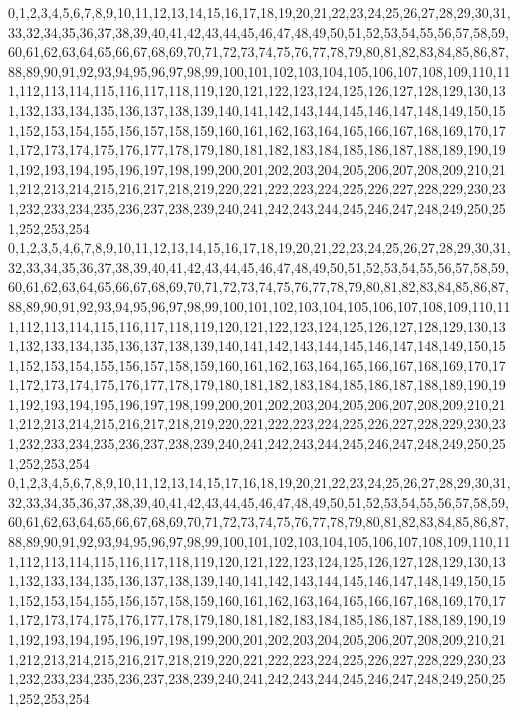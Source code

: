 \documentclass[12pt]{article}
\begin{document}
{0,1,2,3,4,5,6,7,8,9,10,11,12,13,14,15,16,17,18,19,20,21,22,23,24,25,26,27,28,29,30,31,33,32,34,35,36,37,38,39,40,41,42,43,44,45,46,47,48,49,50,51,52,53,54,55,56,57,58,59,60,61,62,63,64,65,66,67,68,69,70,71,72,73,74,75,76,77,78,79,80,81,82,83,84,85,86,87,88,89,90,91,92,93,94,95,96,97,98,99,100,101,102,103,104,105,106,107,108,109,110,111,112,113,114,115,116,117,118,119,120,121,122,123,124,125,126,127,128,129,130,131,132,133,134,135,136,137,138,139,140,141,142,143,144,145,146,147,148,149,150,151,152,153,154,155,156,157,158,159,160,161,162,163,164,165,166,167,168,169,170,171,172,173,174,175,176,177,178,179,180,181,182,183,184,185,186,187,188,189,190,191,192,193,194,195,196,197,198,199,200,201,202,203,204,205,206,207,208,209,210,211,212,213,214,215,216,217,218,219,220,221,222,223,224,225,226,227,228,229,230,231,232,233,234,235,236,237,238,239,240,241,242,243,244,245,246,247,248,249,250,251,252,253,254\\
0,1,2,3,5,4,6,7,8,9,10,11,12,13,14,15,16,17,18,19,20,21,22,23,24,25,26,27,28,29,30,31,32,33,34,35,36,37,38,39,40,41,42,43,44,45,46,47,48,49,50,51,52,53,54,55,56,57,58,59,60,61,62,63,64,65,66,67,68,69,70,71,72,73,74,75,76,77,78,79,80,81,82,83,84,85,86,87,88,89,90,91,92,93,94,95,96,97,98,99,100,101,102,103,104,105,106,107,108,109,110,111,112,113,114,115,116,117,118,119,120,121,122,123,124,125,126,127,128,129,130,131,132,133,134,135,136,137,138,139,140,141,142,143,144,145,146,147,148,149,150,151,152,153,154,155,156,157,158,159,160,161,162,163,164,165,166,167,168,169,170,171,172,173,174,175,176,177,178,179,180,181,182,183,184,185,186,187,188,189,190,191,192,193,194,195,196,197,198,199,200,201,202,203,204,205,206,207,208,209,210,211,212,213,214,215,216,217,218,219,220,221,222,223,224,225,226,227,228,229,230,231,232,233,234,235,236,237,238,239,240,241,242,243,244,245,246,247,248,249,250,251,252,253,254\\
0,1,2,3,4,5,6,7,8,9,10,11,12,13,14,15,17,16,18,19,20,21,22,23,24,25,26,27,28,29,30,31,32,33,34,35,36,37,38,39,40,41,42,43,44,45,46,47,48,49,50,51,52,53,54,55,56,57,58,59,60,61,62,63,64,65,66,67,68,69,70,71,72,73,74,75,76,77,78,79,80,81,82,83,84,85,86,87,88,89,90,91,92,93,94,95,96,97,98,99,100,101,102,103,104,105,106,107,108,109,110,111,112,113,114,115,116,117,118,119,120,121,122,123,124,125,126,127,128,129,130,131,132,133,134,135,136,137,138,139,140,141,142,143,144,145,146,147,148,149,150,151,152,153,154,155,156,157,158,159,160,161,162,163,164,165,166,167,168,169,170,171,172,173,174,175,176,177,178,179,180,181,182,183,184,185,186,187,188,189,190,191,192,193,194,195,196,197,198,199,200,201,202,203,204,205,206,207,208,209,210,211,212,213,214,215,216,217,218,219,220,221,222,223,224,225,226,227,228,229,230,231,232,233,234,235,236,237,238,239,240,241,242,243,244,245,246,247,248,249,250,251,252,253,254\\
}
\end{document}
